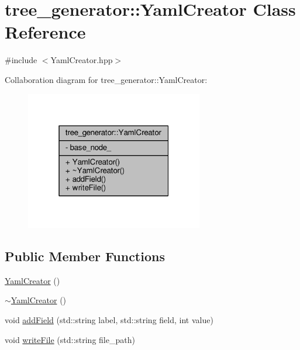\hypertarget{classtree__generator_1_1YamlCreator}{\section{tree\-\_\-generator\-:\-:Yaml\-Creator Class Reference}
\label{classtree__generator_1_1YamlCreator}
}


{\ttfamily \#include $<$Yaml\-Creator.\-hpp$>$}



Collaboration diagram for tree\-\_\-generator\-:\-:Yaml\-Creator\-:
\nopagebreak
\begin{figure}[H]
\begin{center}
\leavevmode
\includegraphics[width=220pt]{df/d63/classtree__generator_1_1YamlCreator__coll__graph}
\end{center}
\end{figure}
\subsection*{Public Member Functions}
\begin{DoxyCompactItemize}
\item 
\hyperlink{classtree__generator_1_1YamlCreator_a3f6974a64bcceaa2c6e6bb073e760000_a3f6974a64bcceaa2c6e6bb073e760000}{Yaml\-Creator} ()
\item 
\hyperlink{classtree__generator_1_1YamlCreator_ab1d128e8feaf7d64c3a5b9a961e140b7_ab1d128e8feaf7d64c3a5b9a961e140b7}{$\sim$\-Yaml\-Creator} ()
\item 
void \hyperlink{classtree__generator_1_1YamlCreator_aedbf0bc9538c49e16c2185703a40815b_aedbf0bc9538c49e16c2185703a40815b}{add\-Field} (std\-::string label, std\-::string field, int value)
\item 
void \hyperlink{classtree__generator_1_1YamlCreator_af1260eb2488a08879a8cd63418ec571b_af1260eb2488a08879a8cd63418ec571b}{write\-File} (std\-::string file\-\_\-path)
\end{DoxyCompactItemize}
